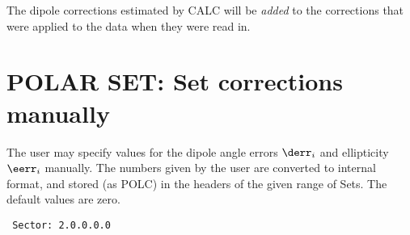 The dipole corrections estimated by CALC will be {\em added} to the corrections
that were applied to the data when they were read in.

\section{POLAR SET: Set corrections manually}
\label{.set}

The user may specify values for the dipole angle errors $\derr_i$ and
ellipticity $\eerr_i$ manually. The numbers given by the user are converted to
internal format, and stored (as POLC) in the headers of the given range of
Sets. The default values are zero.

\spbegin %
\spend %
%
\spbegin %
\spend %
%
\spbegin %
\spend %
%
\spbegin %
\suser{\scr}
\spend %
%
\spbegin %
\suser{\scr}
\spend %
%
\spbegin %
\suser{\scr}
\spend %
%
\spbegin %
\suser{\scr} %
\svbegin \begin{verbatim}
 Sector: 2.0.0.0.0
\end{verbatim}\svend
\spend %

